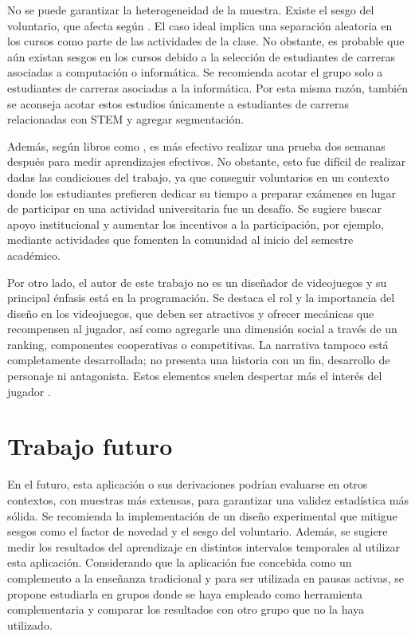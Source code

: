 No se puede garantizar la heterogeneidad de la muestra. Existe el sesgo del voluntario, que afecta según \cite{volunterBias}. El caso ideal implica una separación aleatoria en los cursos como parte de las actividades de la clase. No obstante, es probable que aún existan sesgos en los cursos debido a la selección de estudiantes de carreras asociadas a computación o informática. Se recomienda acotar el grupo solo a estudiantes de carreras asociadas a la informática. Por esta misma razón, también se aconseja acotar estos estudios únicamente a estudiantes de carreras relacionadas con STEM y agregar segmentación.

Además, según libros como \cite{Rogers2002InteractionDB}, es más efectivo realizar una prueba dos semanas después para medir aprendizajes efectivos. No obstante, esto fue difícil de realizar dadas las condiciones del trabajo, ya que conseguir voluntarios en un contexto donde los estudiantes prefieren dedicar su tiempo a preparar exámenes en lugar de participar en una actividad universitaria fue un desafío. Se sugiere buscar apoyo institucional y aumentar los incentivos a la participación, por ejemplo, mediante actividades que fomenten la comunidad al inicio del semestre académico.

Por otro lado, el autor de este trabajo no es un diseñador de videojuegos y su principal énfasis está en la programación. Se destaca el rol y la importancia del diseño en los videojuegos, que deben ser atractivos y ofrecer mecánicas que recompensen al jugador, así como agregarle una dimensión social a través de un ranking, componentes cooperativas o competitivas. La narrativa tampoco está completamente desarrollada; no presenta una historia con un fin, desarrollo de personaje ni antagonista. Estos elementos suelen despertar más el interés del jugador \cite{Zea2014ModelingST, FrangoSilveira2019BuildingEN}.


\section{Trabajo futuro}



En el futuro, esta aplicación o sus derivaciones podrían evaluarse en otros contextos, con muestras más extensas, para garantizar una validez estadística más sólida. Se recomienda la implementación de un diseño experimental que mitigue sesgos como el factor de novedad y el sesgo del voluntario. Además, se sugiere medir los resultados del aprendizaje en distintos intervalos temporales al utilizar esta aplicación. Considerando que la aplicación fue concebida como un complemento a la enseñanza tradicional y para ser utilizada en pausas activas, se propone estudiarla en grupos donde se haya empleado como herramienta complementaria y comparar los resultados con otro grupo que no la haya utilizado.

